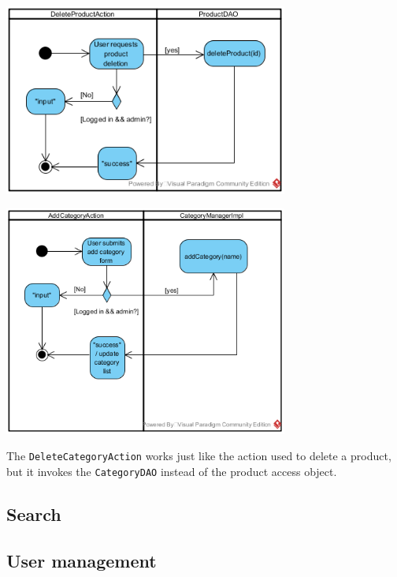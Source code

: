 \documentclass[11pt]{article}
\begin{document}
	\begin{center}
	\includegraphics[width=0.7\textwidth]{img/products/deleteproduct}
	\end{center}
	
	\begin{center}
	\includegraphics[width=0.7\textwidth]{img/products/addcategory}
	\end{center}
	
	The \texttt{DeleteCategoryAction} works just like the action used to delete a product, but it invokes the \texttt{CategoryDAO} instead of the product access object.
    
    \subsection{Search} %
     
    \subsection{User management} %
      
	
\end{document}
